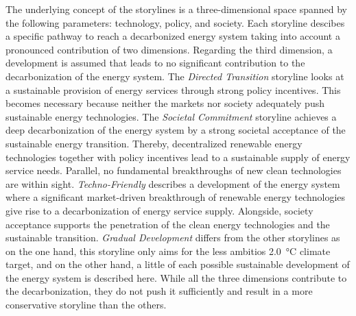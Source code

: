 
The underlying concept of the storylines is a three-dimensional space spanned by the following parameters: technology, policy, and society. Each storyline descibes a specific pathway to reach a decarbonized energy system taking into account a pronounced contribution of two dimensions. Regarding the third dimension, a development is assumed that leads to no significant contribution to the decarbonization of the energy system. The \textit{Directed Transition} storyline looks at a sustainable provision of energy services through strong policy incentives. This becomes necessary because neither the markets nor society adequately push sustainable energy technologies. The \textit{Societal Commitment} storyline achieves a deep decarbonization of the energy system by a strong societal acceptance of the sustainable energy transition. Thereby, decentralized renewable energy technologies together with policy incentives lead to a sustainable supply of energy service needs. Parallel, no fundamental breakthroughs of new clean technologies are within sight. \textit{Techno-Friendly} describes a development of the energy system where a significant market-driven breakthrough of renewable energy technologies give rise to a decarbonization of energy service supply. Alongside, society acceptance supports the penetration of the clean energy technologies and the sustainable transition. \textit{Gradual Development} differs from the other storylines as on the one hand, this storyline only aims for the less ambitios \SI{2.0}{\degreeCelsius} climate target, and on the other hand, a little of each possible sustainable development of the energy system is described here. While all the three dimensions contribute to the decarbonization, they do not push it sufficiently and result in a more conservative storyline than the others.\newline

